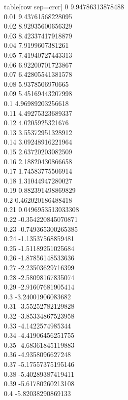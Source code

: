  table[row sep=crcr]{%
0	9.94786313878488\\
0.01	9.43761568228095\\
0.02	8.92935600656329\\
0.03	8.42337417918879\\
0.04	7.9199607381261\\
0.05	7.41940727443313\\
0.06	6.92200701723867\\
0.07	6.42805541381578\\
0.08	5.9378506970665\\
0.09	5.45169443207998\\
0.1	4.96989203256618\\
0.11	4.49275323689337\\
0.12	4.0205925321676\\
0.13	3.55372951328912\\
0.14	3.09248916221964\\
0.15	2.63720203082509\\
0.16	2.18820430866658\\
0.17	1.74583775506914\\
0.18	1.31044947280027\\
0.19	0.882391498869829\\
0.2	0.462020186488418\\
0.21	0.0496953513033308\\
0.22	-0.354220845070871\\
0.23	-0.749365300265385\\
0.24	-1.13537568859481\\
0.25	-1.51189251025684\\
0.26	-1.87856148533636\\
0.27	-2.23503629716399\\
0.28	-2.58098167835074\\
0.29	-2.91607681905414\\
0.3	-3.24001906083682\\
0.31	-3.55252782129828\\
0.32	-3.85334867523958\\
0.33	-4.1422574985344\\
0.34	-4.41906456251755\\
0.35	-4.68361845119883\\
0.36	-4.9358096627248\\
0.37	-5.17557375195146\\
0.38	-5.40289387419411\\
0.39	-5.61780260213108\\
0.4	-5.82038290869133\\
}
